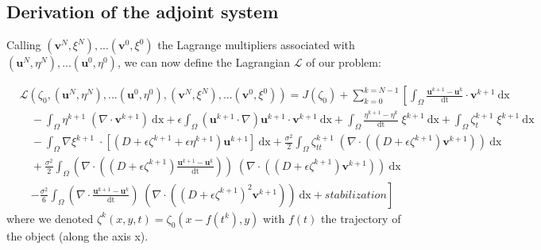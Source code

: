 \documentclass[11pt,a4paper]{article}
\begin{document}
		\subsection{Derivation of the adjoint system}
		Calling $(\mathbf{v}^N, \xi^N), ... (\mathbf{v}^0, \xi^0)$ the Lagrange multipliers associated with $(\mathbf{u}^N, \eta^N), ... (\mathbf{u}^0, \eta^0)$, we can now define the Lagrangian $\mathcal{L} $ of our problem: 
		
		\begin{equation}
			\begin{split}
				&\mathcal{L}(\zeta_0, (\mathbf{u}^N, \eta^N), ... (\mathbf{u}^0, \eta^0), 	(\mathbf{v}^N, \xi^N), ... (\mathbf{v}^0, \xi^0))	= J(\zeta_0) + \sum_{k=0}^{k=N-1} \left[ \int_{\Omega} \! \frac{\mathbf{u}^{k+1} - \mathbf{u}^k}{\mathrm{dt}} \cdot	\mathbf{v}^{k+1} \: \mathrm{dx} \right. \\
				 &\quad - \int_{\Omega} \! \eta^{k+1} \; (\nabla \cdot \mathbf{v}^{k+1}) \: \mathrm{dx} + \epsilon \! \int_{\Omega} \! (\mathbf{u}^{k+1} \cdot \nabla ) \mathbf{u}^{k+1} \cdot	\mathbf{v}^{k+1} \: \mathrm{dx} + \displaystyle\int_{\Omega}\! \frac{\eta^{k+1} - \eta^{k}}{\mathrm{dt}} \; \xi^{k+1} \: \mathrm{dx} + \int_{\Omega}\! \zeta^{k+1}_t \; \xi^{k+1} \: \mathrm{dx} \\
				 &\quad-\int_{\Omega}\! \nabla \xi^{k+1} \; \cdot [(D + \epsilon \zeta^{k+1} + \epsilon \eta^{k+1}) \mathbf{u}^{k+1}] \:	\mathrm{dx} + \frac{\sigma^2}{2} \! \int_{\Omega} \! \zeta^{k+1}_{tt}  \; (\nabla \cdot( (D+\epsilon \zeta^{k+1}) \mathbf{v}^{k+1})) \: \mathrm{dx} \\ 
					&\quad+ \frac{\sigma^2}{2} \! \int_{\Omega} \!  (\nabla \cdot ((D + \epsilon \zeta^{k+1})	\frac{\mathbf{u}^{k+1} - \mathbf{u}^{k}}{\mathrm{dt}})) \; (\nabla \cdot ((D + \epsilon \zeta^{k+1}) \mathbf{v}^{k+1})) \: \mathrm{dx} \\
					&\quad\left. - \frac{\sigma^2}{6} \! \int_{\Omega} \! (\nabla 
					\cdot \frac{\mathbf{u}^{k+1} - \mathbf{u}^{k}}{\mathrm{dt}}) \; (\nabla  \cdot	((D + \epsilon \zeta^{k+1})^2  \mathbf{v}^{k+1})) \: \mathrm{dx} + stabilization\right]	
			\end{split}
		\end{equation}
		where we denoted $\zeta^k(x,y,t) = \zeta_0(x-f(t^k),y)$ with $f(t)$ the trajectory of the object (along the axis x).
		
\end{document}
